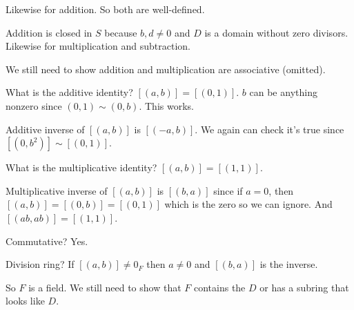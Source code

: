 \documentclass[class=article,crop=false]{standalone}
\begin{document}
Likewise for addition. So both are well-defined. 

Addition is closed in $ S$ because  $ b,d \neq 0 $ and  $ D$ is a domain without zero divisors. Likewise for multiplication and subtraction.

We still need to show addition and multiplication are associative (omitted).

What is the additive identity?  $ [(a,b)] = [(0,1)]$.  $ b$ can be anything nonzero since $ (0,1) \sim (0,b)$. This works. 

Additive inverse of $ [(a,b)]$ is  $[(-a,b)] $. We again can check it's true since  $ [(0,b^2)] \sim [(0,1)]$. 

What is the multiplicative identity? $ [(a,b)] = [(1,1)]$. 

Multiplicative inverse of  $ [(a,b)] $ is  $ [(b,a)]$ since if $ a = 0$, then $ [(a,b)]= [(0,b)] = [(0,1)]$ which is the zero so we can ignore. And  $ [(ab,ab)] = [(1,1)]$.

Commutative? Yes.

Division ring? If $ [(a,b)]\neq 0_F$ then  $ a\neq 0$ and  $ [(b,a)]$ is the inverse.

So  $ F$ is a field. We still need to show that  $ F$ contains the  $ D$ or has a subring that looks like  $ D$.
\end{document}
